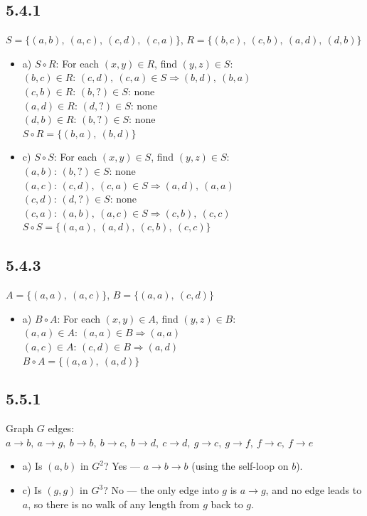 \documentclass{article}
\begin{document}
\subsection*{5.4.1}
$S = \{(a,b),\ (a,c),\ (c,d),\ (c,a)\}$, \quad $R = \{(b,c),\ (c,b),\ (a,d),\ (d,b)\}$
\begin{itemize}
    \item a) $S \circ R$: For each $(x,y) \in R$, find $(y,z) \in S$:\\
    $(b,c) \in R$: $(c,d),\ (c,a) \in S \Rightarrow (b,d),\ (b,a)$\\
    $(c,b) \in R$: $(b,?) \in S$: none\\
    $(a,d) \in R$: $(d,?) \in S$: none\\
    $(d,b) \in R$: $(b,?) \in S$: none\\
    $S \circ R = \{(b,a),\ (b,d)\}$

    \item c) $S \circ S$: For each $(x,y) \in S$, find $(y,z) \in S$:\\
    $(a,b)$: $(b,?) \in S$: none\\
    $(a,c)$: $(c,d),\ (c,a) \in S \Rightarrow (a,d),\ (a,a)$\\
    $(c,d)$: $(d,?) \in S$: none\\
    $(c,a)$: $(a,b),\ (a,c) \in S \Rightarrow (c,b),\ (c,c)$\\
    $S \circ S = \{(a,a),\ (a,d),\ (c,b),\ (c,c)\}$
\end{itemize}

\subsection*{5.4.3}
$A = \{(a,a),\ (a,c)\}$, \quad $B = \{(a,a),\ (c,d)\}$
\begin{itemize}
    \item a) $B \circ A$: For each $(x,y) \in A$, find $(y,z) \in B$:\\
    $(a,a) \in A$: $(a,a) \in B \Rightarrow (a,a)$\\
    $(a,c) \in A$: $(c,d) \in B \Rightarrow (a,d)$\\
    $B \circ A = \{(a,a),\ (a,d)\}$
\end{itemize}

\subsection*{5.5.1}
Graph $G$ edges: $a \to b,\ a \to g,\ b \to b,\ b \to c,\ b \to d,\ c \to d,\ g \to c,\ g \to f,\ f \to c,\ f \to e$
\begin{itemize}
    \item a) Is $(a,b)$ in $G^2$? Yes --- $a \to b \to b$ (using the self-loop on $b$).
    \item c) Is $(g,g)$ in $G^3$? No --- the only edge into $g$ is $a \to g$, and no edge leads to $a$, so there is no walk of any length from $g$ back to $g$.
\end{itemize}
\end{document}
